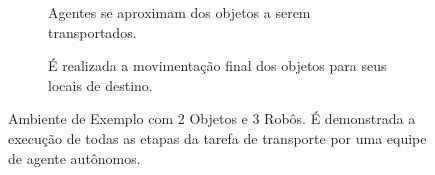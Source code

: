 \begin{figure}[htpb]
  \vspace{0.3cm}
  \begin{subfigure}[t]{0.45\textwidth}
    \centering
    \caption{Agentes se aproximam dos objetos a serem transportados.}
  \end{subfigure}
  \hspace{0.2cm}
  \begin{subfigure}[t]{0.45\textwidth}
    \centering
    \caption{É realizada a movimentação final dos objetos para seus locais de destino.}
  \end{subfigure}

  \caption[Ambiente de exemplo com 2 objetos e 3 robôs]{Ambiente de Exemplo com 2 Objetos e 3 Robôs. É demonstrada a execução de todas as etapas da tarefa de transporte por uma equipe de agente autônomos.}
  \label{fig:execution_example}
\end{figure}

